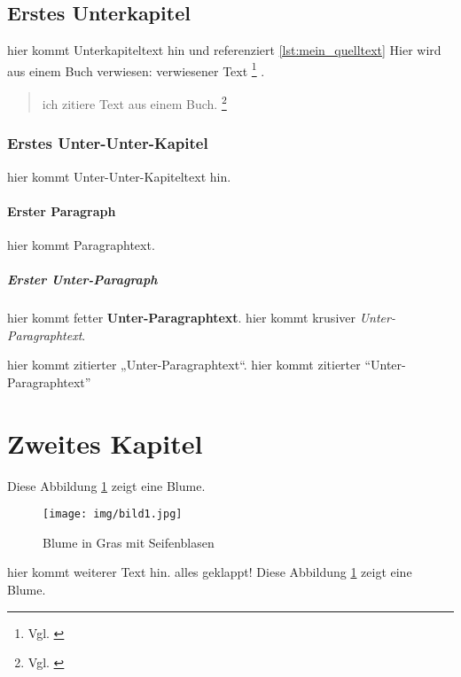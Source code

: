 \documentclass[11pt]{article}
\begin{document}
\subsection{Erstes Unterkapitel}
hier kommt Unterkapiteltext hin und referenziert \ref{lst:mein_quelltext} 
Hier wird aus einem Buch verwiesen: verwiesener Text \footnote{Vgl. \cite[S. 190]{teller1994visibility}} .
\begin{quote}
    ich zitiere Text aus einem Buch. \footnote{Vgl. \cite[S. 190]{wiki:Fußball}}
\end{quote}
\subsubsection{Erstes Unter-Unter-Kapitel}
hier kommt Unter-Unter-Kapiteltext hin.

\paragraph{Erster Paragraph}
hier kommt Paragraphtext.

\subparagraph{Erster Unter-Paragraph}
hier kommt fetter \textbf{Unter-Paragraphtext}.
hier kommt krusiver \textit{Unter-Paragraphtext}.

hier kommt zitierter „Unter-Paragraphtext“. 
hier kommt zitierter \enquote{Unter-Paragraphtext}
\newpage
\section{Zweites Kapitel}

Diese Abbildung \ref{fig: Blume}  zeigt eine Blume.

\begin{figure}[H]
    \centering
    \texttt{[image: img/bild1.jpg]}
    \caption[Blume]{Blume in Gras mit Seifenblasen}
    \label{fig: Blume}
\end{figure}
hier kommt weiterer Text hin.
alles geklappt!
Diese Abbildung \ref{fig: Blume} zeigt eine Blume.

\printbibliography
\end{document}
